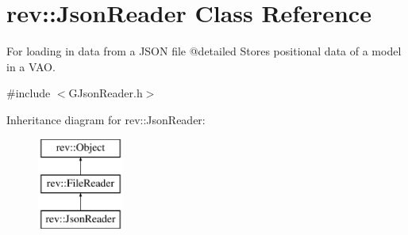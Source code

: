 \hypertarget{classrev_1_1_json_reader}{}\section{rev\+::Json\+Reader Class Reference}
\label{classrev_1_1_json_reader}


For loading in data from a J\+S\+ON file @detailed Stores positional data of a model in a V\+AO.  




{\ttfamily \#include $<$G\+Json\+Reader.\+h$>$}

Inheritance diagram for rev\+::Json\+Reader\+:\begin{figure}[H]
\begin{center}
\leavevmode
\includegraphics[height=3.000000cm]{classrev_1_1_json_reader}
\end{center}
\end{figure}
